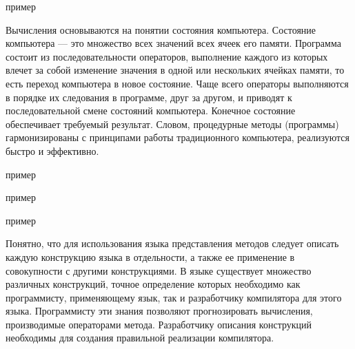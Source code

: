 \begin{SCn}
\begin{scnhaselementrolelist}{пример}
\end{scnhaselementrolelist}
\end{SCn}

Вычисления основываются на понятии состояния компьютера. Состояние компьютера — это множество всех значений всех ячеек
его памяти. Программа состоит из последовательности операторов, выполнение каждого из которых влечет за собой изменение
значения в одной или нескольких ячейках памяти, то есть переход компьютера в новое состояние.
Чаще всего операторы выполняются в порядке их следования в программе, друг за другом, и приводят к последовательной
смене состояний компьютера. Конечное состояние обеспечивает требуемый результат. Словом, процедурные методы (программы)
гармонизированы с принципами работы традиционного компьютера, реализуются быстро и эффективно.

\begin{SCn}
\begin{scnhaselementrolelist}{пример}
\end{scnhaselementrolelist}
\end{SCn}

\begin{SCn}
\begin{scnhaselementrolelist}{пример}
    \scnitem{}
\end{scnhaselementrolelist}
\end{SCn}

\begin{SCn}
\begin{scnhaselementrolelist}{пример}
\end{scnhaselementrolelist}
\end{SCn}

Понятно, что для использования языка представления методов следует описать каждую конструкцию языка в отдельности, а
также ее применение в совокупности с другими конструкциями. В языке существует множество различных конструкций, точное
определение которых необходимо как программисту, применяющему язык, так и разработчику компилятора для этого
языка. Программисту эти знания позволяют прогнозировать вычисления, производимые операторами метода. Разработчику
описания конструкций необходимы для создания правильной реализации компилятора.

